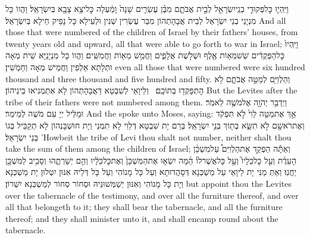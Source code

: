 {וַיִּֽהְי֛וּ כׇּל\maqqaf פְּקוּדֵ֥י בְנֵֽי\maqqaf יִשְׂרָאֵ֖ל לְבֵ֣ית אֲבֹתָ֑ם מִבֶּ֨ן עֶשְׂרִ֤ים שָׁנָה֙ וָמַ֔עְלָה כׇּל\maqqaf יֹצֵ֥א צָבָ֖א בְּיִשְׂרָאֵֽל׃}
{וַהֲווֹ כָּל מִנְיָנֵי בְנֵי יִשְׂרָאֵל לְבֵית אֲבָהָתְהוֹן מִבַּר עֶשְׂרִין שְׁנִין וּלְעֵילָא כָּל נָפֵיק חֵילָא בְּיִשְׂרָאֵל׃}
{And all those that were numbered of the children of Israel by their fathers’ houses, from twenty years old and upward, all that were able to go forth to war in Israel;}{}
{וַיִּֽהְיוּ֙ כׇּל\maqqaf הַפְּקֻדִ֔ים שֵׁשׁ\maqqaf מֵא֥וֹת אֶ֖לֶף וּשְׁלֹ֣שֶׁת אֲלָפִ֑ים וַחֲמֵ֥שׁ מֵא֖וֹת וַחֲמִשִּֽׁים׃}
{וַהֲווֹ כָּל מִנְיָנַיָּא שֵׁית מְאָה וּתְלָתָא אַלְפִין וַחֲמֵישׁ מְאָה וְחַמְשִׁין׃}
{even all those that were numbered were six hundred thousand and three thousand and five hundred and fifty.}{}
{וְהַלְוִיִּ֖ם לְמַטֵּ֣ה אֲבֹתָ֑ם לֹ֥א הׇתְפָּקְד֖וּ בְּתוֹכָֽם׃ \petucha }
{וְלֵיוָאֵי לְשִׁבְטָא דַּאֲבָהָתְהוֹן לָא אִתְמְנִיאוּ בֵּינֵיהוֹן׃}
{But the Levites after the tribe of their fathers were not numbered among them.}{}
{וַיְדַבֵּ֥ר יְהֹוָ֖ה אֶל\maqqaf מֹשֶׁ֥ה לֵּאמֹֽר׃}
{וּמַלֵּיל יְיָ עִם מֹשֶׁה לְמֵימַר׃}
{And the \lord\space spoke unto Moses, saying:}{}
{אַ֣ךְ אֶת\maqqaf מַטֵּ֤ה לֵוִי֙ לֹ֣א תִפְקֹ֔ד וְאֶת\maqqaf רֹאשָׁ֖ם לֹ֣א תִשָּׂ֑א בְּת֖וֹךְ בְּנֵ֥י יִשְׂרָאֵֽל׃}
{בְּרַם יָת שִׁבְטָא דְּלֵוִי לָא תִמְנֵי וְיָת חוּשְׁבָּנְהוֹן לָא תְקַבֵּיל בְּגוֹ בְּנֵי יִשְׂרָאֵל׃}
{’Howbeit the tribe of Levi thou shalt not number, neither shalt thou take the sum of them among the children of Israel;}{}
{וְאַתָּ֡ה הַפְקֵ֣ד אֶת\maqqaf הַלְוִיִּם֩ עַל\maqqaf מִשְׁכַּ֨ן הָעֵדֻ֜ת וְעַ֣ל כׇּל\maqqaf כֵּלָיו֮ וְעַ֣ל כׇּל\maqqaf אֲשֶׁר\maqqaf לוֹ֒ הֵ֜מָּה יִשְׂא֤וּ אֶת\maqqaf הַמִּשְׁכָּן֙ וְאֶת\maqqaf כׇּל\maqqaf כֵּלָ֔יו וְהֵ֖ם יְשָׁרְתֻ֑הוּ וְסָבִ֥יב לַמִּשְׁכָּ֖ן יַחֲנֽוּ׃}
{וְאַתְּ מַנִּי יָת לֵיוָאֵי עַל מַשְׁכְּנָא דְּסָהֲדוּתָא וְעַל כָּל מָנוֹהִי וְעַל כָּל דְּלֵיהּ אִנּוּן יִטְּלוּן יָת מַשְׁכְּנָא וְיָת כָּל מָנוֹהִי וְאִנּוּן יְשַׁמְּשׁוּנֵּיהּ וּסְחוֹר סְחוֹר לְמַשְׁכְּנָא יִשְׁרוֹן׃}
{but appoint thou the Levites over the tabernacle of the testimony, and over all the furniture thereof, and over all that belongeth to it; they shall bear the tabernacle, and all the furniture thereof; and they shall minister unto it, and shall encamp round about the tabernacle.}{}
